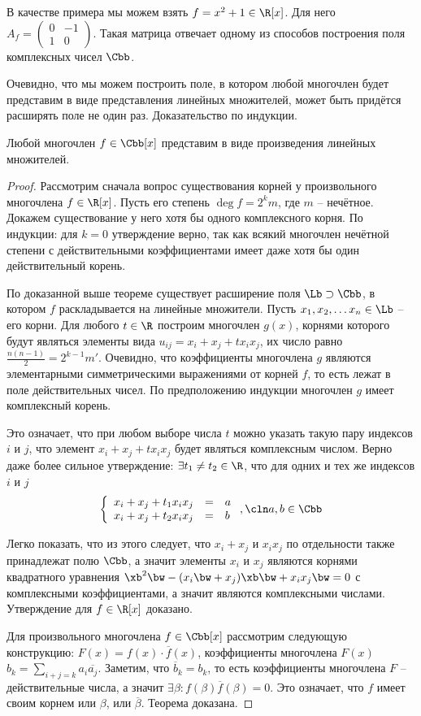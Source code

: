 В качестве примера мы можем взять $f=x^2+1\in\R[x]$. Для него $A_f=\left(\begin{smallmatrix}0&-1\\1&0\end{smallmatrix}\right)$. Такая матрица отвечает одному из способов построения поля комплексных чисел $\Cbb$.

Очевидно, что мы можем построить поле, в котором любой многочлен будет представим в виде представления линейных множителей, может быть придётся расширять поле не один раз. Доказательство по индукции.

\begin{theorem}
  Любой многочлен $f\in\Cbb[x]$ представим в виде произведения линейных множителей.
\end{theorem}
\begin{proof}
  Рассмотрим сначала вопрос существования корней у произвольного многочлена $f\in\R[x]$. Пусть его степень $\deg f=2^km$, где $m$ -- нечётное. Докажем существование у него хотя бы одного комплексного корня. По индукции: для $k=0$ утверждение верно, так как всякий многочлен нечётной степени с действительными коэффициентами имеет даже хотя бы один действительный корень.

    По доказанной выше теореме существует расширение поля $\Lb\supset\Cbb$, в котором $f$ раскладывается на линейные множители. Пусть $x_1,x_2,\dots x_n\in\Lb$ -- его корни. Для любого $t\in\R$ построим многочлен $g(x)$, корнями которого будут являться элементы вида $u_{ij}=x_i+x_j+tx_ix_j$, их число равно $\frac{n(n-1)}2=2^{k-1}m'$. Очевидно, что коэффициенты многочлена $g$ являются элементарными симметрическими выражениями от корней $f$, то есть лежат в поле действительных чисел. По предположению индукции многочлен $g$ имеет комплексный корень.

    Это означает, что при любом выборе числа $t$ можно указать такую пару индексов $i$ и $j$, что элемент $x_i+x_j+tx_ix_j$ будет являться комплексным числом. Верно даже более сильное утверждение: $\exists t_1\ne t_2\in\R$, что для одних и тех же индексов $i$ и $j$
    $$
    \left\{
      \begin{array}{lll}
        x_i+x_j+t_1x_ix_j&=&a\\
        x_i+x_j+t_2x_ix_j&=&b
      \end{array}\right.,\cln a,b\in\Cbb
    $$

    Легко показать, что из этого следует, что $x_i+x_j$ и $x_ix_j$ по отдельности также принадлежат полю $\Cbb$, а значит элементы $x_i$ и $x_j$ являются корнями квадратного уравнения $\xb^2\bw-(x_i\bw+x_j)\xb\bw+x_ix_j\bw=0$ с комплексными коэффициентами, а значит являются комплексными числами. Утверждение для $f\in\R[x]$ доказано.

    Для произвольного многочлена $f\in\Cbb[x]$ рассмотрим следующую конструкцию: $F(x)=f(x)\cdot\overline{f}(x)$, коэффициенты многочлена $F(x)$ $b_k=\sum\limits_{i+j=k}a_i\overline{a_j}$. Заметим, что $\overline{b}_k=b_k$, то есть коэффициенты многочлена $F$ -- действительные числа, а значит $\exists\beta\colon f(\beta)\overline{f}(\beta)=0$. Это означает, что $f$ имеет своим корнем или $\beta$, или $\overline\beta$. Теорема доказана.
\end{proof}

